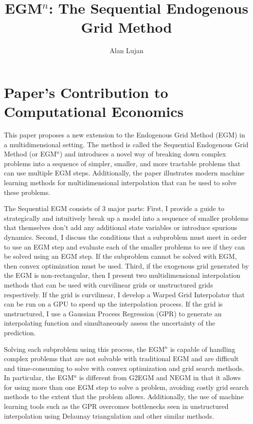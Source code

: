 \documentclass[SequentialEGM]{subfiles}
\title{\Large EGM$^n$: The Sequential Endogenous Grid Method}
\author{Alan Lujan\authNum}
\begin{document}
\maketitle

\begin{authorsinfo}
    \noindent {}
\end{authorsinfo}

\section{Paper's Contribution to Computational Economics}

This paper proposes a new extension to the Endogenous Grid Method (EGM) in a multidimensional setting. The method is called the Sequential Endogenous Grid Method (or EGM$^n$) and introduces a novel way of breaking down complex problems into a sequence of simpler, smaller, and more tractable problems that can use multiple EGM steps. Additionally, the paper illustrates modern machine learning methods for multidimensional interpolation that can be used to solve these problems.

The Sequential EGM consists of 3 major parts: First, I provide a guide to strategically and intuitively break up a model into a sequence of smaller problems that themselves don't add any additional state variables or introduce spurious dynamics. Second, I discuss the conditions that a subproblem must meet in order to use an EGM step and evaluate each of the smaller problems to see if they can be solved using an EGM step. If the subproblem cannot be solved with EGM, then convex optimization must be used. Third, if the exogenous grid generated by the EGM is non-rectangular, then I present two multidimensional interpolation methods that can be used with curvilinear grids or unstructured grids respectively. If the grid is curvilinear, I develop a Warped Grid Interpolator that can be run on a GPU to speed up the interpolation process. If the grid is unstructured, I use a Gaussian Process Regression (GPR) to generate an interpolating function and simultaneously assess the uncertainty of the prediction.

Solving each subproblem using this process, the EGM$^n$ is capable of handling complex problems that are not solvable with traditional EGM and are difficult and time-consuming to solve with convex optimization and grid search methods. In particular, the EGM$^n$ is different from G2EGM and NEGM in that it allows for using more than one EGM step to solve a problem, avoiding costly grid search methods to the extent that the problem allows. Additionally, the use of machine learning tools such as the GPR overcomes bottlenecks seen in unstructured interpolation using Delaunay triangulation and other similar methods.
\end{document}
